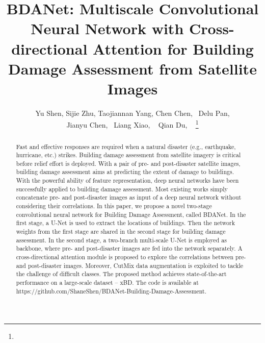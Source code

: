 \documentclass[journal]{IEEEtran}
\begin{document}
\title{BDANet: Multiscale Convolutional Neural Network with Cross-directional Attention for Building \\ Damage Assessment from Satellite Images}


\author{Yu Shen, Sijie Zhu, Taojiannan Yang, Chen Chen,~ Delu Pan, \\ Jianyu Chen,~  Liang Xiao, ~ Qian Du, ~
\thanks{ }}








\maketitle

\begin{abstract}
Fast and effective responses are required when a natural disaster (e.g., earthquake, hurricane, etc.) strikes. Building damage assessment from satellite imagery is critical before relief effort is deployed. With a pair of pre- and post-disaster satellite images, building damage assessment aims at predicting the extent of damage to buildings. With the powerful ability of feature representation, deep neural networks have been successfully applied to building damage assessment. Most existing works simply concatenate pre- and post-disaster images as input of a deep neural network without considering their correlations. In this paper, we propose a novel two-stage convolutional neural network for Building Damage Assessment, called BDANet. In the first stage, a U-Net is used to extract the locations of buildings. Then the network weights from the first stage are shared in the second stage for building damage assessment. In the second stage, a two-branch multi-scale U-Net is employed as backbone, where pre- and post-disaster images are fed into the network separately. A cross-directional attention module is proposed to explore the correlations between pre- and post-disaster images. Moreover, CutMix data augmentation is exploited to tackle the challenge of difficult classes. The proposed method achieves state-of-the-art performance on a large-scale dataset -- xBD. The code is available at https://github.com/ShaneShen/BDANet-Building-Damage-Assessment. 
\end{abstract}
\end{document}
